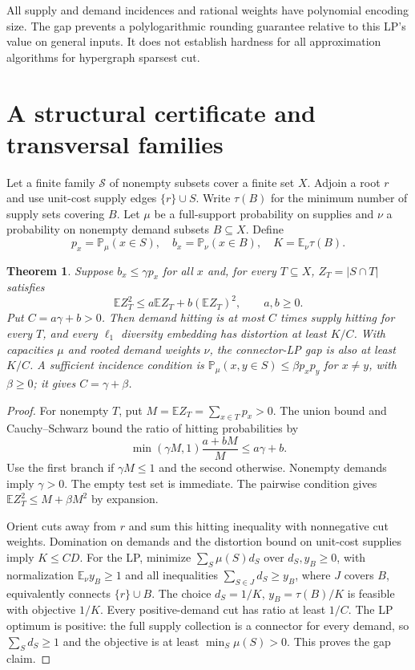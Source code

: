 \documentclass[11pt]{article}
\newtheorem{theorem}{Theorem}
\newcommand{\E}{\mathbb E}
\newcommand{\Prob}{\mathbb P}
\begin{document}
All supply and demand incidences and rational weights have polynomial
encoding size. The gap prevents a polylogarithmic rounding guarantee
relative to this LP's value on general inputs. It does not establish
hardness for all approximation algorithms for hypergraph sparsest cut.

\section{A structural certificate and transversal families}
Let a finite family $\mathcal S$ of nonempty subsets cover a finite set $X$.
Adjoin a root $r$ and use unit-cost supply edges $\{r\}\cup S$.
Write $\tau(B)$ for the minimum number of supply sets covering $B$.
Let $\mu$ be a full-support probability on supplies and $\nu$ a probability
on nonempty demand subsets $B\subseteq X$. Define
\[
 p_x=\Prob_\mu(x\in S),\quad b_x=\Prob_\nu(x\in B),
 \quad K=\E_\nu\tau(B).
\]
\begin{theorem}\label{thm:moment}
Suppose $b_x\le\gamma p_x$ for all $x$ and, for every $T\subseteq X$,
$Z_T=|S\cap T|$ satisfies
\[
 \E Z_T^2\le a\E Z_T+b(\E Z_T)^2,\qquad a,b\ge0.
\]
Put $C=a\gamma+b>0$. Then demand hitting is at most $C$ times supply
hitting for every $T$, and every $\ell_1$ diversity embedding has distortion
at least $K/C$. With capacities $\mu$ and rooted demand weights $\nu$,
the connector-LP gap is also at least $K/C$.
A sufficient incidence condition is
$\Prob_\mu(x,y\in S)\le\beta p_xp_y$ for $x\ne y$, with $\beta\ge0$;
it gives $C=\gamma+\beta$.
\end{theorem}
\begin{proof}
For nonempty $T$, put $M=\E Z_T=\sum_{x\in T}p_x>0$.
The union bound and Cauchy--Schwarz bound the ratio of hitting probabilities by
\[
 \min(\gamma M,1)\frac{a+bM}{M}\le a\gamma+b.
\]
Use the first branch if $\gamma M\le1$ and the second otherwise.
Nonempty demands imply $\gamma>0$. The empty test set is immediate.
The pairwise condition gives $\E Z_T^2\le M+\beta M^2$ by expansion.

Orient cuts away from $r$ and sum this hitting inequality with nonnegative
cut weights. Domination on demands and the distortion bound on unit-cost
supplies imply $K\le CD$.
For the LP, minimize $\sum_S\mu(S)d_S$ over $d_S,y_B\ge0$, with normalization
$\E_\nu y_B\ge1$ and all inequalities $\sum_{S\in J}d_S\ge y_B$,
where $J$ covers $B$, equivalently connects $\{r\}\cup B$.
The choice $d_S=1/K$, $y_B=\tau(B)/K$ is feasible with objective $1/K$.
Every positive-demand cut has ratio at least $1/C$.
The LP optimum is positive: the full supply collection is a connector
for every demand, so $\sum_Sd_S\ge1$ and the objective is at least
$\min_S\mu(S)>0$. This proves the gap claim.
\end{proof}
\end{document}
